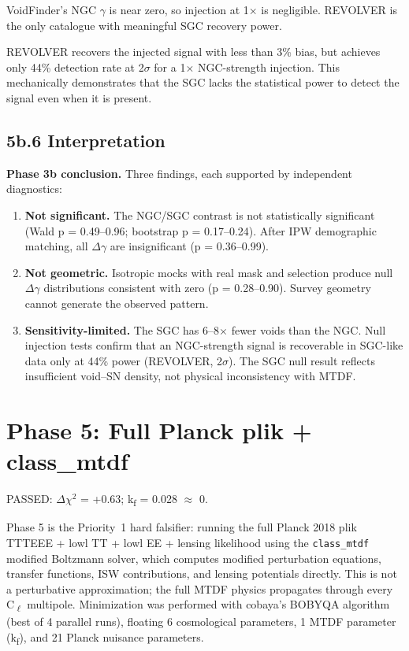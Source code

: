\documentclass[11pt,a4paper]{article}
\begin{document}
VoidFinder's NGC $\gamma$ is near zero, so injection at 1$\times$ is negligible. REVOLVER is the only catalogue with meaningful SGC recovery power.

REVOLVER recovers the injected signal with less than 3\% bias, but achieves only 44\% detection rate at 2$\sigma$ for a 1$\times$ NGC-strength injection. This mechanically demonstrates that the SGC lacks the statistical power to detect the signal even when it is present.

\subsection{5b.6 Interpretation}
\begin{mdframed}[linecolor=accent,linewidth=0.5pt,backgroundcolor=callout-bg,leftline=true,rightline=true,topline=true,bottomline=true,innerleftmargin=8pt,innerrightmargin=8pt,innertopmargin=6pt,innerbottommargin=6pt]
\textbf{Phase 3b conclusion.}
Three findings, each supported by independent diagnostics:
\begin{enumerate}
  \item \textbf{Not significant.} The NGC/\allowbreak{}SGC contrast is not statistically significant (Wald p = 0.49--0.96; bootstrap p = 0.17--0.24). After IPW demographic matching, all $\Delta$$\gamma$ are insignificant (p = 0.36--0.99).
  \item \textbf{Not geometric.} Isotropic mocks with real mask and selection produce null $\Delta$$\gamma$ distributions consistent with zero (p = 0.28--0.90). Survey geometry cannot generate the observed pattern.
  \item \textbf{Sensitivity-limited.} The SGC has 6--8$\times$ fewer voids than the NGC. Null injection tests confirm that an NGC-strength signal is recoverable in SGC-like data only at 44\% power (REVOLVER, 2$\sigma$). The SGC null result reflects insufficient void--SN density, not physical inconsistency with MTDF.
\end{enumerate}
\end{mdframed}

\section{Phase 5: Full Planck plik + class\_\allowbreak{}mtdf}
\label{sec:sec6}
PASSED: $\Delta$$\chi$$^{2}$ = +0.63; k\textsubscript{f} = 0.028 $\approx$ 0.

Phase 5 is the Priority~1 hard falsifier: running the full Planck 2018 plik TTTEEE + lowl TT + lowl EE + lensing likelihood using the \texttt{class\_\allowbreak{}mtdf} modified Boltzmann solver, which computes modified perturbation equations, transfer functions, ISW contributions, and lensing potentials directly. This is not a perturbative approximation; the full MTDF physics propagates through every C\textsubscript{$\ell$} multipole. Minimization was performed with cobaya's BOBYQA algorithm (best of 4 parallel runs), floating 6 cosmological parameters, 1 MTDF parameter (k\textsubscript{f}), and 21 Planck nuisance parameters.
\end{document}
